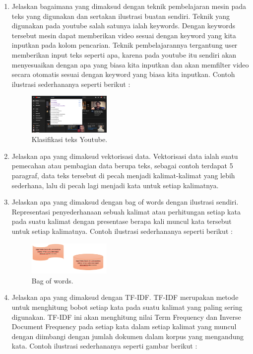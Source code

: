 \begin{enumerate}
	\item Jelaskan bagaimana yang dimaksud dengan teknik pembelajaran mesin pada teks yang digunakan dan sertakan ilustrasi buatan sendiri.
	\hfill\break
	Teknik yang digunakan pada youtube salah satunya ialah keywords. Dengan keywords tersebut mesin dapat memberikan video sesuai dengan keyword yang kita inputkan pada kolom pencarian. Teknik pembelajarannya tergantung user memberikan input teks seperti apa, karena pada youtube itu sendiri akan menyesuaikan dengan apa yang biasa kita inputkan dan akan memfilter video secara otomatis sesuai dengan keyword yang biasa kita inputkan. Contoh ilustrasi sederhananya seperti berikut :

	\begin{figure}[H]
	\centering
		\includegraphics[width=4cm]{figures/1174070/4/materi/3.PNG}
		\caption{Klasifikasi teks Youtube.}
	\end{figure}

	\item Jelaskan apa yang dimaksud vektorisasi data.
	\hfill\break
	Vektorisasi data ialah suatu pemecahan atau pembagian data berupa teks, sebagai contoh terdapat 5 paragraf, data teks tersebut di pecah menjadi kalimat-kalimat yang lebih sederhana, lalu di pecah lagi menjadi kata untuk setiap kalimatnya. 

	\item Jelaskan apa yang dimaksud dengan bag of words dengan ilustrasi sendiri.
	\hfill\break
	Representasi penyederhanaan sebuah kalimat atau perhitungan setiap kata pada suatu kalimat dengan presentase berapa kali muncul kata tersebut untuk setiap kalimatnya. Contoh ilustrasi sederhananya seperti berikut : 

	\begin{figure}[H]
	\centering
		\includegraphics[width=4cm]{figures/1174070/4/materi/4.PNG}
		\caption{Bag of words.}
	\end{figure}

	\item Jelaskan apa yang dimaksud dengan TF-IDF.
	\hfill\break
	TF-IDF merupakan metode untuk menghitung bobot setiap kata pada suatu kalimat yang paling sering digunakan. TF-IDF ini akan menghitung nilai Term Frequency dan Inverse Document Frequency pada setiap kata dalam setiap kalimat yang muncul dengan diimbangi dengan jumlah dokumen dalam korpus yang mengandung kata. Contoh ilustrasi sederhananya seperti gambar berikut : 


\end{enumerate}
